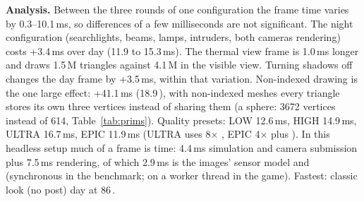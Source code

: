 \textbf{Analysis.} Between the three rounds of one configuration the frame time varies by 0.3--10.1\,ms, so differences of a few milliseconds are not significant. The night configuration (searchlights, beams, lamps, intruders, both  cameras rendering) costs +3.4\,ms over day (11.9 to 15.3\,ms). The thermal view frame is 1.0\,ms longer and draws 1.5\,M triangles against 4.1\,M in the visible view. Turning shadows off changes the day frame by +3.5\,ms, within that variation. Non-indexed drawing is the one large effect: +41.1\,ms (18.9\,), with non-indexed meshes every triangle stores its own three vertices instead of sharing them (a sphere: 3672 vertices instead of 614, Table~\ref{tab:prims}). Quality presets: LOW 12.6\,ms, HIGH 14.9\,ms, ULTRA 16.7\,ms, EPIC 11.9\,ms (ULTRA uses 8$\times$ , EPIC 4$\times$ plus ). In this headless setup much of a frame is  time: 4.4\,ms simulation and  camera submission plus 7.5\,ms rendering, of which 2.9\,ms is the  images' sensor model and  (synchronous in the benchmark; on a worker thread in the game). Fastest: classic look (no post) day at 86\,.
